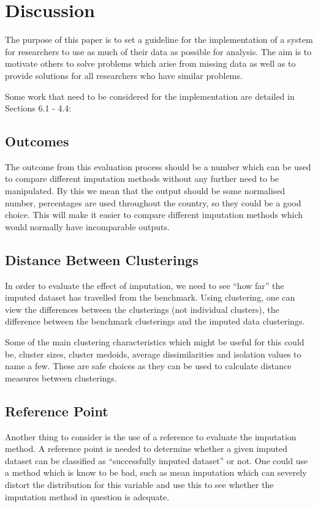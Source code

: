 \documentclass[conference,compsoc]{IEEEtran}
\begin{document}

	\section{Discussion} %
	\label{sec:discussion}
		The purpose of this paper is to set a guideline for the implementation of a system for researchers to use as much of their data as possible for analysis. The aim is to motivate others to solve problems which arise from missing data as well as to provide solutions for all researchers who have similar problems.

		Some work that need to be considered for the implementation are detailed in Sections 6.1 - 4.4:
		\subsection{Outcomes} %
		\label{sub:outcomes}
			The outcome from this evaluation process should be a number which can be used to compare different imputation methods without any further need to be manipulated. By this we mean that the output should be some normalised number, percentages are used throughout the country, so they could be a good choice. This will make it easier to compare different imputation methods which would normally have incomparable outputs.

		\subsection{Distance Between Clusterings} %
		\label{sub:distance_between_datasets}
			In order to evaluate the effect of imputation, we need to see ``how far'' the imputed dataset has travelled from the benchmark. Using clustering, one can view the differences between the clusterings (not individual clusters), the difference between the benchmark clusterings and the imputed data clusterings. 

			Some of the main clustering characteristics which might be useful for this could be, cluster sizes, cluster medoids, average dissimilarities and isolation values to name a few. These are safe choices as they can be used to calculate distance measures between clusterings. 

		\subsection{Reference Point} %
		\label{sub:reference_point}
			Another thing to consider is the use of a reference to evaluate the imputation method. A reference point is needed to determine whether a given imputed dataset can be classified as ``successfully imputed dataset'' or not. One could use a method which is know to be bad, such as mean imputation which can severely distort the distribution for this variable \cite{mean} and use this to see whether the imputation method in question is adequate.
\end{document}
